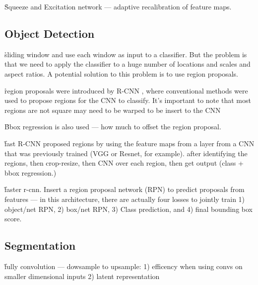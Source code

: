 
\r{Squeeze and Excitation network --- adaptive recalibration of feature maps. \cite{DBLP:journals/corr/abs-1709-01507} }



\subsection{Object Detection}

\r{sliding window and use each window as input to a classifier. But the problem is that we need to apply the classifier to a huge number of locations and scales and aspect ratios. A potential solution to this problem is to use region proposals.}

\r{region proposals were introduced by R-CNN , where conventional methods were used to propose regions for the CNN to classify. It's important to note that most regions are not square may need to be warped to be insert to the CNN}

\r{Bbox regression is also used --- how much to offset the region proposal.}


\r{fast R-CNN proposed regions by using the feature maps from a layer from a CNN that was previously trained (VGG or Resnet, for example). after identifying the regions, then crop-resize, then CNN over each region, then get output (class + bbox regression.)}

\r{faster r-cnn. Insert a region proposal network (RPN) to predict proposals from features --- in this architecture, there are actually four losses to jointly train 1) object/net RPN, 2) box/net RPN, 3) Class prediction, and 4) final bounding box score.}



% 


\subsection{Segmentation}

\r{fully convolution --- dowsample to upsample: 1) efficency when using convs on smaller dimensional inputs 2) latent representation}

